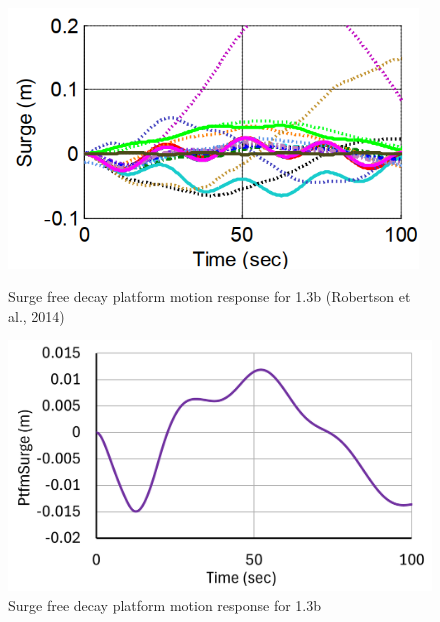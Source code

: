 \documentclass[a4paper]{article}
\begin{document}
\begin{figure}[H]
    \begin{minipage}{0.47\textwidth}
        \centering
        \includegraphics[width=0.97\textwidth]{1.3b_surge.png}
        \caption{\small Surge free decay platform motion response for 1.3b (Robertson et al., 2014)}
        \label{fig:1.3b_surge}
    \end{minipage}
    \hfill
    \begin{minipage}{0.5\textwidth}
        \centering
        \includegraphics[width=1\textwidth]{1.3b_surge_mine.png}
        \caption{\small Surge free decay platform motion response for 1.3b}
        \label{fig:1.3b_surge_mine}
    \end{minipage}
\end{figure}
\end{document}
